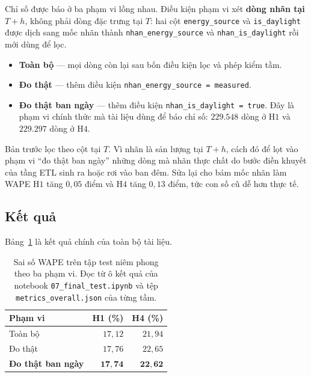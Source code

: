 \documentclass[12pt, a4paper]{report}
\begin{document}
Chỉ số được báo ở ba phạm vi lồng nhau. Điều kiện phạm vi xét \textbf{dòng nhãn tại $T{+}h$},
không phải dòng đặc trưng tại $T$: hai cột \texttt{energy\_source} và \texttt{is\_daylight} được dịch
sang mốc nhãn thành \texttt{nhan\_energy\_source} và \texttt{nhan\_is\_daylight} rồi mới dùng để lọc.

\begin{itemize}
    \item \textbf{Toàn bộ} --- mọi dòng còn lại sau bốn điều kiện lọc và phép kiểm tầm.
    \item \textbf{Đo thật} --- thêm điều kiện \texttt{nhan\_energy\_source = measured}.
    \item \textbf{Đo thật ban ngày} --- thêm điều kiện \texttt{nhan\_is\_daylight = true}. Đây là
    phạm vi chính thức mà tài liệu dùng để báo chỉ số: $229.548$ dòng ở H$1$ và $229.297$ dòng
    ở H$4$.
\end{itemize}

Bản trước lọc theo cột tại $T$. Vì nhãn là sản lượng tại $T{+}h$, cách đó để lọt vào phạm vi
``đo thật ban ngày'' những dòng mà nhãn thực chất do bước điền khuyết của tầng ETL sinh ra hoặc
rơi vào ban đêm. Sửa lại cho bám mốc nhãn làm WAPE H$1$ tăng $0{,}05$ điểm và H$4$ tăng
$0{,}13$ điểm, tức con số cũ dễ hơn thực tế.

\FloatBarrier
\subsection{Kết quả}

Bảng~\ref{tab:ket_qua_test} là kết quả chính của toàn bộ tài liệu.

\begin{table}[htbp]
\centering
\caption{Sai số WAPE trên tập test niêm phong theo ba phạm vi. Đọc từ ô kết quả của notebook
\texttt{07\_final\_test.ipynb} và tệp \texttt{metrics\_overall.json} của từng tầm.}
\label{tab:ket_qua_test}
\small
\begin{tabular}{l r r}
\toprule
\textbf{Phạm vi} & \textbf{H1 (\%)} & \textbf{H4 (\%)} \\
\midrule
Toàn bộ                   & $17{,}12$ & $21{,}94$ \\
Đo thật                   & $17{,}76$ & $22{,}65$ \\
\textbf{Đo thật ban ngày} & $\mathbf{17{,}74}$ & $\mathbf{22{,}62}$ \\
\bottomrule
\end{tabular}
\end{table}
\end{document}
